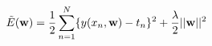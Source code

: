 $$\tilde{E}({\bf w})=\frac{1}{2}\sum_{n=1}^{N}\{{y(x_{n},{\bf w})-t_{n}}\}^{2} + \frac{\lambda}{2}||{\bf w}||^{2}$$
